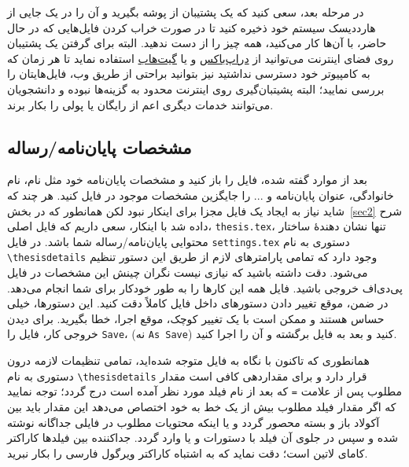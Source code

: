     در مرحله بعد، سعی کنید که  یک پشتیبان از پوشه 
     بگیرید و آن را در یک جایی از هارددیسک سیستم خود ذخیره کنید تا در صورت خراب کردن فایل‌هایی که در حال حاضر، با آن‌ها کار می‌کنید، همه چیز را از 
     دست ندهید. البته برای گرفتن یک پشتیبان روی فضای اینترنت می‌توانید از 
     \href{https://www.dropbox.com/}{دراپ‌باکس}%
      و یا 
      \href{https://github.com}{گیت‌هاب}%
       استفاده نماید تا هر زمان که به کامپیوتر خود 
     دسترسی نداشتید نیز بتوانید براحتی از طریق وب، فایل‌هایتان را بررسی نمایید؛‌ البته پشیتبان‌گیری روی اینترنت محدود به گزینه‌ها نبوده و دانشجویان 
     می‌توانند  خدمات دیگری اعم از رایگان یا پولی را بکار برند. 
     
     \subsection{ مشخصات پایان‌نامه/رساله}
    بعد از موارد گفته شده، فایل 
    را باز کنید و مشخصات پایان‌نامه خود مثل نام، نام خانوادگی، عنوان پایان‌نامه و ... را جایگزین مشخصات موجود در فایل
     کنید. هر چند که شاید نیاز به ایجاد یک فایل مجزا برای اینکار نبود لکن همانطور که در بخش~\hbox{\ref{sec2}} شرح داده شد با اینکار، سعی داریم که فایل 
     اصلی، \Verb!thesis.tex!، تنها نشان دهندهٔ ساختار محتوایی پایان‌نامه/رساله شما باشد. 
     در  فایل \Verb!settings.tex! دستوری به نام \Verb+\thesisdetails+ وجود دارد که تمامی پارامترهای لازم از طریق این دستور تنظیم می‌شود. 
     دقت داشته باشید که نیازی نیست 
    نگران چینش این مشخصات در فایل پی‌دی‌اف خروجی باشید. فایل     
    همه این کارها را به طور خودکار برای شما انجام می‌دهد. در ضمن، موقع تغییر دادن دستورهای داخل فایل
     کاملاً  دقت کنید. این دستورها، خیلی حساس هستند و ممکن است با یک تغییر کوچک، موقع اجرا، خطا بگیرید. برای دیدن خروجی کار، فایل 
     را     \Verb!Save!،     (نه     \Verb!As Save!)    کنید و بعد به فایل 
    برگشته و آن را اجرا کنید.
    
    همانطوری که تاکنون با نگاه به فایل  متوجه شده‌اید، تمامی تنظیمات لازمه درون دستوری به نام \Verb+\thesisdetails+ 
    قرار دارد و برای مقداردهی کافی است مقدار مطلوب پس از علامت \Verb+=+ که بعد از نام فیلد مورد نظر آمده است درج گردد؛‌ توجه نمایید که 
    اگر مقدار فیلد مطلوب بیش از یک خط به خود اختصاص می‌دهد این مقدار باید بین آکولاد باز و بسته محصور گردد و یا اینکه محتویات مطلوب 
    در فایلی جداگانه نوشته شده و سپس در جلوی آن فیلد با دستورات \Verb++  و یا \Verb++ وارد گردد. 
    جداکننده بین فیلدها کاراکتر کامای لاتین است؛ دقت نماید که به اشتباه کاراکتر ویرگول فارسی را بکار نبرید. 

